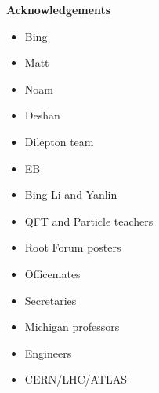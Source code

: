\begin{center}
\textbf{\LARGE Acknowledgements}
\end{center} 

\begin{itemize}
    \item Bing
    \item Matt
    \item Noam
    \item Deshan
    \item Dilepton team
   \item EB
    \item Bing Li and Yanlin
    \item QFT and Particle teachers
    \item Root Forum posters
    \item Officemates
    \item Secretaries
    \item Michigan professors
    \item Engineers
    \item CERN/LHC/ATLAS
\end{itemize}


